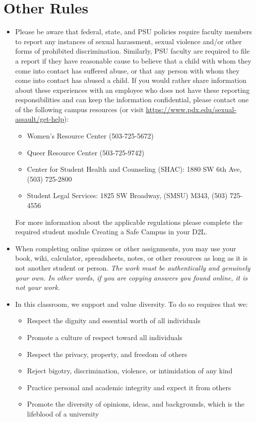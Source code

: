 \documentclass[
]{article}
\providecommand{\tightlist}{%
  \setlength{\itemsep}{0pt}\setlength{\parskip}{0pt}}
\begin{document}
\hypertarget{other-rules}{%
\section{Other Rules}\label{other-rules}}

\begin{itemize}
\item
  Please be aware that federal, state, and PSU policies require faculty
  members to report any instances of sexual harassment, sexual violence
  and/or other forms of prohibited discrimination. Similarly, PSU
  faculty are required to file a report if they have reasonable cause to
  believe that a child with whom they come into contact has suffered
  abuse, or that any person with whom they come into contact has abused
  a child. If you would rather share information about these experiences
  with an employee who does not have these reporting responsibilities
  and can keep the information confidential, please contact one of the
  following campus resources (or visit
  \url{https://www.pdx.edu/sexual-assault/get-help}):

  \begin{itemize}
  \tightlist
  \item
    Women's Resource Center (503-725-5672)
  \item
    Queer Resource Center (503-725-9742)
  \item
    Center for Student Health and Counseling (SHAC): 1880 SW 6th Ave,
    (503) 725-2800
  \item
    Student Legal Services: 1825 SW Broadway, (SMSU) M343, (503)
    725-4556
  \end{itemize}

  For more information about the applicable regulations please complete
  the required student module Creating a Safe Campus in your D2L.
\item
  When completing online quizzes or other assignments, you may use your
  book, wiki, calculator, spreadsheets, notes, or other resources as
  long as it is not another student or person. \emph{The work must be
  authentically and genuinely your own. In other words, if you are
  copying answers you found online, it is not your work.}
\item
  In this classroom, we support and value diversity. To do so requires
  that we:

  \begin{itemize}
  \tightlist
  \item
    Respect the dignity and essential worth of all individuals
  \item
    Promote a culture of respect toward all individuals
  \item
    Respect the privacy, property, and freedom of others
  \item
    Reject bigotry, discrimination, violence, or intimidation of any
    kind
  \item
    Practice personal and academic integrity and expect it from others
  \item
    Promote the diversity of opinions, ideas, and backgrounds, which is
    the lifeblood of a university
  \end{itemize}


\end{itemize}
\end{document}
